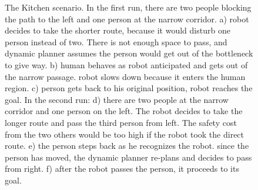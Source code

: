 \begin{figure}[p!]
{        }%
        
    \caption{%
	The Kitchen scenario. In the first run, there are two people blocking the path to the left and one person at the narrow corridor. a) robot decides to take the shorter route, because it would disturb one person instead of two. There is not enough space to pass, and dynamic planner assumes the person would get out of the bottleneck to give way. b) human behaves as robot anticipated and gets out of the narrow passage. robot slows down because it enters the human region. c) person gets back to his original position, robot reaches the goal. In the second run: d) there are two people at the narrow corridor and one person on the left. The robot decides to take the longer route and pass the third person from left. The safety cost from the two others would be too high if the robot took the direct route. e) the person steps back as he recognizes the robot. since the person has moved, the dynamic planner re-plans and decides to pass from right. f) after the robot passes the person, it proceeds to its goal.
     }%
   \label{fig:kitchen}
\end{figure}







